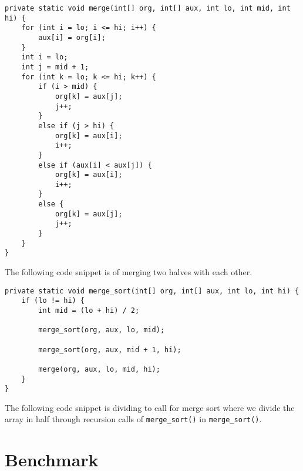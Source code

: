 \documentclass[a4paper,11pt]{article}
\begin{document}
\begin{verbatim}
private static void merge(int[] org, int[] aux, int lo, int mid, int hi) {
    for (int i = lo; i <= hi; i++) {
        aux[i] = org[i];
    }
    int i = lo; 
    int j = mid + 1;
    for (int k = lo; k <= hi; k++) {
        if (i > mid) {
            org[k] = aux[j];
            j++;
        }
        else if (j > hi) {
            org[k] = aux[i];
            i++;
        }
        else if (aux[i] < aux[j]) {
            org[k] = aux[i];
            i++;
        }
        else {
            org[k] = aux[j];
            j++;
        }
    }
}
\end{verbatim}
    The following code snippet is of merging two halves with each other.
\begin{verbatim}
private static void merge_sort(int[] org, int[] aux, int lo, int hi) {
    if (lo != hi) {
        int mid = (lo + hi) / 2;
        
        merge_sort(org, aux, lo, mid);
        
        merge_sort(org, aux, mid + 1, hi);
        
        merge(org, aux, lo, mid, hi);
    }
}
\end{verbatim}
    The following code snippet is dividing to call for merge sort where we divide the array in half through recursion calls of \texttt{merge\_sort()} in \texttt{merge\_sort()}.

\section*{Benchmark}
\end{document}
